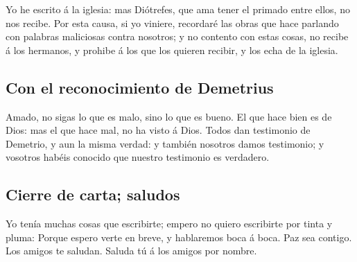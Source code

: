  Yo he escrito á la iglesia: mas Diótrefes, que ama tener
el primado entre ellos, no nos recibe.  Por esta causa,
si yo viniere, recordaré las obras que hace parlando con palabras
maliciosas contra nosotros; y no contento con estas cosas, no recibe á
los hermanos, y prohibe á los que los quieren recibir, y los echa de la
iglesia.

\hypertarget{con-el-reconocimiento-de-demetrius}{%
\subsection{Con el reconocimiento de
Demetrius}\label{con-el-reconocimiento-de-demetrius}}

 Amado, no sigas lo que es malo, sino lo que es bueno. El
que hace bien es de Dios: mas el que hace mal, no ha visto á Dios.
 Todos dan testimonio de Demetrio, y aun la misma verdad:
y también nosotros damos testimonio; y vosotros habéis conocido que
nuestro testimonio es verdadero.

\hypertarget{cierre-de-carta-saludos}{%
\subsection{Cierre de carta; saludos}\label{cierre-de-carta-saludos}}

 Yo tenía muchas cosas que escribirte; empero no quiero
escribirte por tinta y pluma:  Porque espero verte en
breve, y hablaremos boca á boca. Paz sea contigo. Los amigos te saludan.
Saluda tú á los amigos por nombre.
